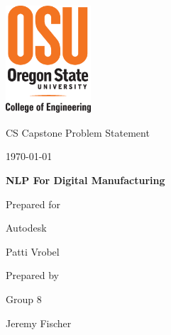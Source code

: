 \documentclass[onecolumn, draftclsnofoot,10pt, compsoc]{IEEEtran}
\def \CapstoneTeamNumber{		8}
\def \GroupMemberOne{			Jeremy Fischer}
\def \CapstoneProjectName{		NLP For Digital Manufacturing}
\def \CapstoneSponsorCompany{	Autodesk}
\def \CapstoneSponsorPerson{		Patti Vrobel}
\def \DocType{		Problem Statement
				}
\newcommand{\NameSigPair}[1]{\par
\makebox[2.75in][r]{#1} \hfil 	\makebox[3.25in]{\makebox[2.25in]{\hrulefill} \hfill		\makebox[.75in]{\hrulefill}}
\par\vspace{-12pt} \textit{\tiny\noindent
\makebox[2.75in]{} \hfil		\makebox[3.25in]{\makebox[2.25in][r]{Signature} \hfill	\makebox[.75in][r]{Date}}}}
\renewcommand{\NameSigPair}[1]{#1}
\begin{document}
\begin{titlepage}
    \begin{singlespace}
    	\includegraphics[height=4cm]{Images/coe_v_spot1}
        \par\vspace{.2in}
        \centering
        \scshape{
            \huge CS Capstone \DocType \par
            {\large\today}\par
            \vspace{.5in}
            \textbf{\Huge\CapstoneProjectName}\par
            \vfill
            {\large Prepared for}\par
            \Huge \CapstoneSponsorCompany\par
            \vspace{5pt}
            {\Large\NameSigPair{\CapstoneSponsorPerson}\par}
            {\large Prepared by }\par
            Group\CapstoneTeamNumber\par
            \vspace{5pt}
            {\Large
                \NameSigPair{\GroupMemberOne}\par
            }
            \vspace{20pt}
        }
        \begin{abstract}

\end{abstract}
\end{singlespace}
\end{titlepage}
\end{document}
